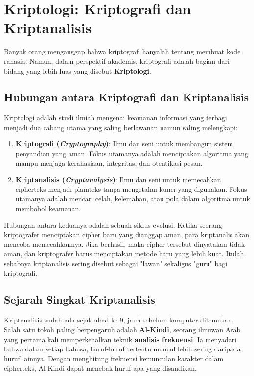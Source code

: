 \section{Kriptologi: Kriptografi dan Kriptanalisis}

Banyak orang menganggap bahwa kriptografi hanyalah tentang membuat kode rahasia. Namun, dalam perspektif akademis, kriptografi adalah bagian dari bidang yang lebih luas yang disebut \textbf{Kriptologi}.

\subsection{Hubungan antara Kriptografi dan Kriptanalisis}

Kriptologi adalah studi ilmiah mengenai keamanan informasi yang terbagi menjadi dua cabang utama yang saling berlawanan namun saling melengkapi:

\begin{enumerate}
    \item \textbf{Kriptografi (\textit{Cryptography})}: Ilmu dan seni untuk membangun sistem penyandian yang aman. Fokus utamanya adalah menciptakan algoritma yang mampu menjaga kerahasiaan, integritas, dan otentikasi pesan.
    \item \textbf{Kriptanalisis (\textit{Cryptanalysis})}: Ilmu dan seni untuk memecahkan cipherteks menjadi plainteks tanpa mengetahui kunci yang digunakan. Fokus utamanya adalah mencari celah, kelemahan, atau pola dalam algoritma untuk membobol keamanan.
\end{enumerate}

Hubungan antara keduanya adalah sebuah siklus evolusi. Ketika seorang kriptografer menciptakan cipher baru yang dianggap aman, para kriptanalis akan mencoba memecahkannya. Jika berhasil, maka cipher tersebut dinyatakan tidak aman, dan kriptografer harus menciptakan metode baru yang lebih kuat. Itulah sebabnya kriptanalisis sering disebut sebagai "lawan" sekaligus "guru" bagi kriptografi.

\subsection{Sejarah Singkat Kriptanalisis}

Kriptanalisis sudah ada sejak abad ke-9, jauh sebelum komputer ditemukan. Salah satu tokoh paling berpengaruh adalah \textbf{Al-Kindi}, seorang ilmuwan Arab yang pertama kali memperkenalkan teknik \textbf{analisis frekuensi}. Ia menyadari bahwa dalam setiap bahasa, huruf-huruf tertentu muncul lebih sering daripada huruf lainnya. Dengan menghitung frekuensi kemunculan karakter dalam cipherteks, Al-Kindi dapat menebak huruf apa yang disandikan.

